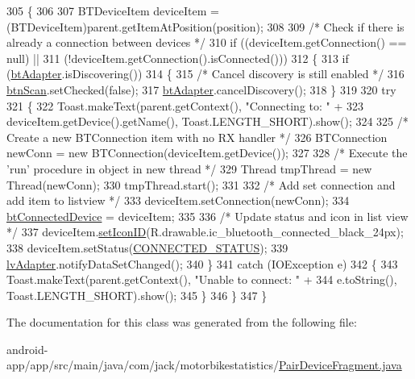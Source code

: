 \begin{DoxyCode}
305                                                                                          \{
306 
307             BTDeviceItem deviceItem = (BTDeviceItem)parent.getItemAtPosition(position);
308 
309             \textcolor{comment}{/* Check if there is already a connection between devices */}
310             \textcolor{keywordflow}{if} ((deviceItem.getConnection() == null) ||
311                     (!deviceItem.getConnection().isConnected()))
312             \{
313                 \textcolor{keywordflow}{if} (\hyperlink{class_android_app_1_1_pair_device_fragment_a54c71cf078647dbcd55742fc31a0a191}{btAdapter}.isDiscovering())
314                 \{
315                     \textcolor{comment}{/* Cancel discovery is still enabled */}
316                     \hyperlink{class_android_app_1_1_pair_device_fragment_ada62059f31e97361bd94f2828cdc44e1}{btnScan}.setChecked(\textcolor{keyword}{false});
317                     \hyperlink{class_android_app_1_1_pair_device_fragment_a54c71cf078647dbcd55742fc31a0a191}{btAdapter}.cancelDiscovery();
318                 \}
319 
320                 \textcolor{keywordflow}{try}
321                 \{
322                     Toast.makeText(parent.getContext(), \textcolor{stringliteral}{"Connecting to: "} +
323                             deviceItem.getDevice().getName(), Toast.LENGTH\_SHORT).show();
324 
325                     \textcolor{comment}{/* Create a new BTConnection item with no RX handler */}
326                     BTConnection newConn = \textcolor{keyword}{new} BTConnection(deviceItem.getDevice());
327 
328                     \textcolor{comment}{/* Execute the 'run' procedure in object in new thread */}
329                     Thread tmpThread = \textcolor{keyword}{new} Thread(newConn);
330                     tmpThread.start();
331 
332                     \textcolor{comment}{/* Add set connection and add item to listview */}
333                     deviceItem.setConnection(newConn);
334                     \hyperlink{class_android_app_1_1_pair_device_fragment_ac3d93a383672355ed54c56dc3e21e827}{btConnectedDevice} = deviceItem;
335 
336                     \textcolor{comment}{/* Update status and icon in list view */}
337                     deviceItem.\hyperlink{class_android_app_1_1_b_t_device_item_a893140b78c17184a199ac419f0fc7be7}{setIconID}(R.drawable.ic\_bluetooth\_connected\_black\_24px);
338                     deviceItem.setStatus(\hyperlink{class_android_app_1_1_pair_device_fragment_a199a2a30c45008ec5a7360d11854f02f}{CONNECTED\_STATUS});
339                     \hyperlink{class_android_app_1_1_pair_device_fragment_a27eee15fc9f4328366bba7e795e026ac}{lvAdapter}.notifyDataSetChanged();
340                 \}
341                 \textcolor{keywordflow}{catch} (IOException e)
342                 \{
343                     Toast.makeText(parent.getContext(), \textcolor{stringliteral}{"Unable to connect: "} +
344                             e.toString(), Toast.LENGTH\_SHORT).show();
345                 \}
346             \}
347         \}
\end{DoxyCode}


The documentation for this class was generated from the following file\+:\begin{DoxyCompactItemize}
\item 
android-\/app/app/src/main/java/com/jack/motorbikestatistics/\hyperlink{_pair_device_fragment_8java}{Pair\+Device\+Fragment.\+java}\end{DoxyCompactItemize}
